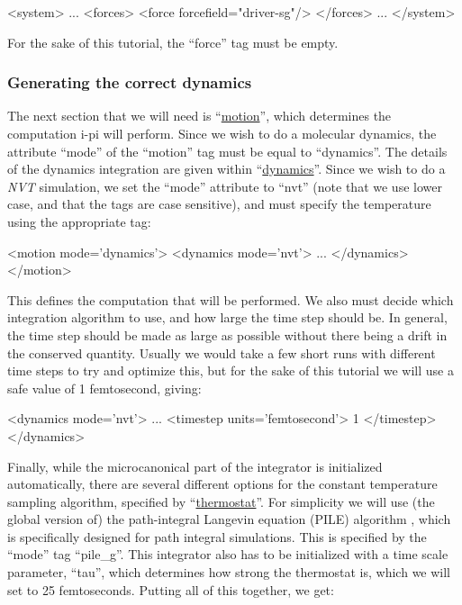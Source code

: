 \documentclass[11pt,english,fleqn]{report}
\newenvironment{code}{%
\footnotesize 
\verbatim
}{
\endverbatim
\normalsize
}
\begin{document}
\begin{code}
<system>
   ...
   <forces>
      <force forcefield="driver-sg"/>
   </forces>
   ...
</system>
\end{code}

For the sake of this tutorial, the ``force'' tag must be empty.

\subsubsection{Generating the correct dynamics}

The next section that we will need is 
{}``\hyperref[MOTION]{motion}'', which determines the computation i-pi
will perform. Since we wish to do a molecular dynamics, the attribute
``mode'' of the ``motion'' tag must be equal to ``dynamics''.
The details of the dynamics integration are given within
{}``\hyperref[DYNAMICS]{dynamics}''.  Since we wish to
do a \emph{NVT} simulation, we set the {}``mode'' attribute to {}``nvt''
(note that we use lower case, and that the tags are case sensitive),
and must specify the temperature using the appropriate tag:

\begin{code}
<motion mode='dynamics'>
   <dynamics mode='nvt'>
      ...
   </dynamics>
</motion>
\end{code}

This defines the computation that will be performed. We also must decide
which integration algorithm to use, and how large the time step should
be. In general, the time step should be made as large as possible
without there being a drift in the conserved quantity. Usually we
would take a few short runs with different time steps to try and optimize
this, but for the sake of this tutorial we will use a safe value of
1 femtosecond, giving:

\begin{code}
<dynamics mode='nvt'>
   ...
   <timestep units='femtosecond'> 1 </timestep>
</dynamics>
\end{code}

Finally, while the microcanonical part of the integrator
is initialized automatically, there are several different options
for the constant temperature sampling algorithm,
specified by {}``\hyperref[THERMOSTATS]{thermostat}''. For simplicity we
will use (the global version of) the path-integral Langevin equation (PILE) algorithm \cite{ceri+10jcp},
which is specifically designed for path integral simulations. 
This is specified by the {}``mode'' tag {}``pile\_g''. 
This integrator also has to
be initialized with a time scale parameter, {}``tau'', which determines
how strong the thermostat is, which we will set to 25 femtoseconds. 
Putting all of this together, we get:
\end{document}
